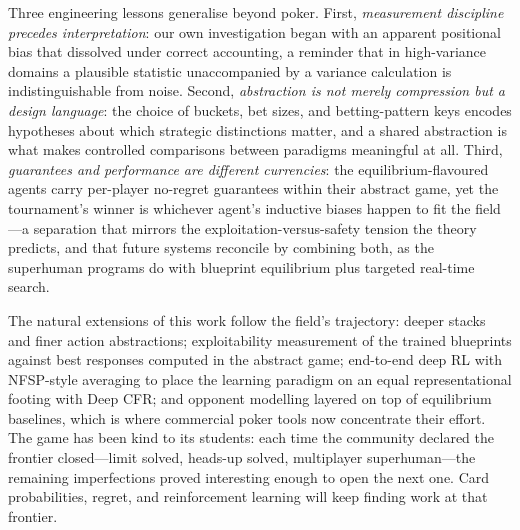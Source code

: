 Three engineering lessons generalise beyond poker. First, \emph{measurement discipline precedes interpretation}: our own investigation began with an apparent positional bias that dissolved under correct accounting, a reminder that in high-variance domains a plausible statistic unaccompanied by a variance calculation is indistinguishable from noise. Second, \emph{abstraction is not merely compression but a design language}: the choice of buckets, bet sizes, and betting-pattern keys encodes hypotheses about which strategic distinctions matter, and a shared abstraction is what makes controlled comparisons between paradigms meaningful at all. Third, \emph{guarantees and performance are different currencies}: the equilibrium-flavoured agents carry per-player no-regret guarantees within their abstract game, yet the tournament's winner is whichever agent's inductive biases happen to fit the field---a separation that mirrors the exploitation-versus-safety tension the theory predicts, and that future systems reconcile by combining both, as the superhuman programs do with blueprint equilibrium plus targeted real-time search.

The natural extensions of this work follow the field's trajectory: deeper stacks and finer action abstractions; exploitability measurement of the trained blueprints against best responses computed in the abstract game; end-to-end deep RL with NFSP-style averaging to place the learning paradigm on an equal representational footing with Deep CFR; and opponent modelling layered on top of equilibrium baselines, which is where commercial poker tools now concentrate their effort. The game has been kind to its students: each time the community declared the frontier closed---limit solved, heads-up solved, multiplayer superhuman---the remaining imperfections proved interesting enough to open the next one. Card probabilities, regret, and reinforcement learning will keep finding work at that frontier.
